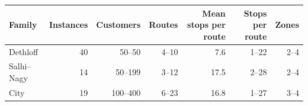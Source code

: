 \begin{tabular}{lrrrrrr}
\toprule
Family & Instances & Customers & Routes & Mean stops per route & Stops per route & Zones \\
\midrule
Dethloff & 40 & 50--50 & 4--10 & 7.6 & 1--22 & 2--4 \\
Salhi--Nagy & 14 & 50--199 & 3--12 & 17.5 & 2--28 & 2--4 \\
City & 19 & 100--400 & 6--23 & 16.8 & 1--27 & 3--4 \\
\bottomrule
\end{tabular}
